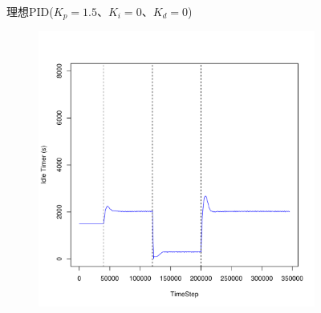 \documentclass[a4j]{ujarticle}
\begin{document}
\begin{figure}[htbp]
\begin{subfigure}{0.49\hsize}
   \label{subfig:scenario_7_stateBreakdown_0_691200_1-5_0_0_0_shortFrequency_addIn100s_random}
 \end{subfigure}
 \caption{理想PID($K_p = 1.5、K_i = 0、K_d = 0$)}
 \label{fig:result_p_scenario7_shortFrequency_addIn100s_random}
\end{figure}
\clearpage

\begin{figure}[htbp]
 \centering
 \begin{subfigure}{0.49\hsize}
   \centering
   \includegraphics[width=1.0\hsize]{scenario_7_idleTimer_0_691200_1-35_0-000203_0_0_shortFrequency_addIn100s_random.pdf}
   \label{subfig:scenario_7_idleTimer_0_691200_1-35_0-000203_0_0_shortFrequency_addIn100s_random}
 \end{subfigure}
 \par\bigskip %
 \begin{subfigure}{0.49\hsize}

\end{subfigure}
\end{figure}
\end{document}
